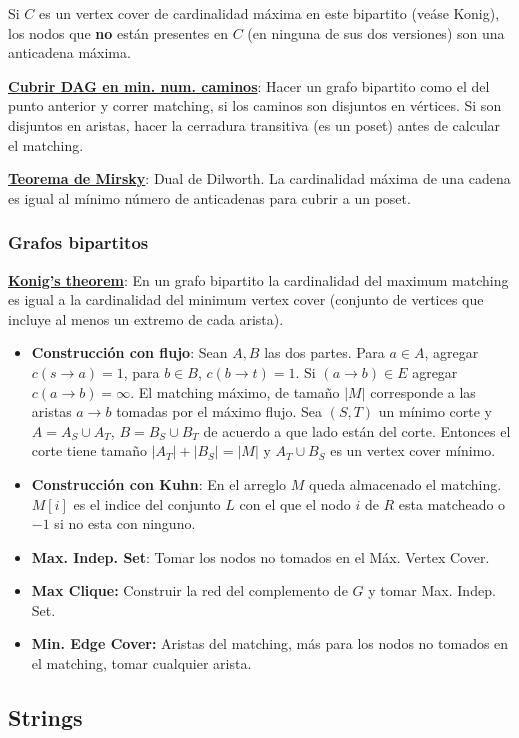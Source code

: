 Si $C$ es un vertex cover de cardinalidad máxima en este bipartito (veáse Konig), los nodos que \textbf{no} están presentes en $C$ (en ninguna de sus dos versiones) son una anticadena máxima.


\ul{\textbf{Cubrir DAG en min. num. caminos}}:
Hacer un grafo bipartito como el del punto anterior y correr matching, si los caminos son disjuntos en vértices. Si son disjuntos en aristas, hacer la cerradura transitiva (es un poset) antes de calcular el matching.

   
\ul{\textbf{Teorema de Mirsky}}: Dual de Dilworth. La cardinalidad máxima de una cadena es igual al mínimo número de anticadenas para cubrir a un poset.

\subsubsection{Grafos bipartitos}
\ul{\textbf{Konig's theorem}}: En un grafo bipartito la cardinalidad del maximum matching es igual a la cardinalidad del minimum vertex cover (conjunto de vertices que incluye al menos un extremo de cada arista).
\begin{itemize}
    \item \textbf{Construcción con flujo}: Sean $A, B$ las dos partes. Para $a \in A$, agregar $c(s\to a) = 1$, para $b \in B$, $c(b\to t) = 1$.
    Si $(a\to b) \in E$ agregar $c(a\to b) = \infty$. El matching máximo, de tamaño $|M|$ corresponde a las aristas $a \to b$ tomadas por el máximo flujo. Sea $(S, T)$ un mínimo corte y $A = A_S \cup A_T$, $B = B_S \cup B_T$ de acuerdo a que lado están del corte. Entonces el corte tiene tamaño $|A_T| + |B_S| = |M|$ y $A_T \cup B_S$ es un vertex cover mínimo.
    \item \textbf{Construcción con Kuhn}: En el arreglo $M$ queda almacenado el matching. $M[i]$ es el indice del conjunto $L$ con el que el nodo $i$ de $R$ esta matcheado o $-1$ si no esta con ninguno.
        \item \textbf{Max. Indep. Set}: Tomar los nodos no tomados en el Máx. Vertex Cover.
\item \textbf{Max Clique:} Construir la red del complemento de $G$ y tomar Max. Indep. Set.
    \item \textbf{Min. Edge Cover:} Aristas del matching, más para los nodos no tomados en el matching, tomar cualquier arista.
\end{itemize}

\subsection{Strings}

